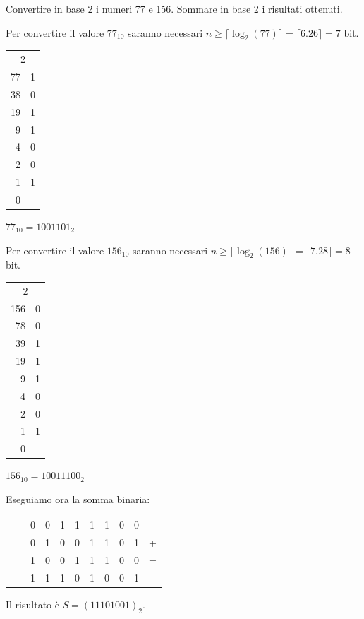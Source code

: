 \begin{Exercise}[label={ex:somma_conv}]
    Convertire in base 2 i numeri 77 e 156. Sommare in base 2 i risultati ottenuti.
\end{Exercise}

\begin{Answer}[ref={ex:somma_conv}]
    Per convertire il valore $77_{10}$ saranno necessari $n \geq \lceil \log_2(77) \rceil = \lceil 6.26 \rceil = 7$ bit. 

    \begin{center}
    \begin{tabular}{r|r}
        \multicolumn{2}{c}{2} \\
        77 & 1 \\
        38 & 0 \\
        19 & 1 \\
        9 & 1 \\
        4 & 0 \\
        2 & 0 \\
        1 & 1 \\
        0 &
    \end{tabular}
    \end{center}

    $77_{10} = 1001101_2$
    
    Per convertire il valore $156_{10}$ saranno necessari $n \geq \lceil \log_2(156) \rceil = \lceil 7.28 \rceil = 8$ bit. 

    \begin{center}
    \begin{tabular}{r|r}
        \multicolumn{2}{c}{2} \\
        156 & 0 \\
        78 & 0 \\
        39 & 1 \\
        19 & 1 \\
        9 & 1 \\
        4 & 0 \\
        2 & 0 \\
        1 & 1 \\
        0 &
    \end{tabular}
    \end{center}

    $156_{10} = 10011100_2$
    
    Eseguiamo ora la somma binaria:
    \begin{table}[H]
    \centering
    \begin{tabular}{ccccccccccc}
            &      & 0 & 0 & 1 & 1 & 1 & 1 & 0 & 0 & \\
            &      & 0 & 1 & 0 & 0 & 1 & 1 & 0 & 1 &+\\
            &      & 1 & 0 & 0 & 1 & 1 & 1 & 0 & 0 &=\\
            \hline
            & & 1 & 1 & 1 & 0 & 1 & 0 & 0 & 1 &\\
    \end{tabular}
    \end{table}
    Il risultato è $S = (11101001)_{2}$.
\end{Answer}
